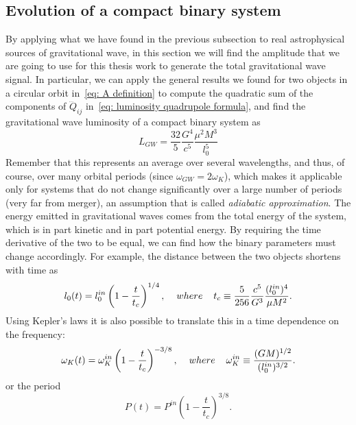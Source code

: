 \subsection{Evolution of a compact binary system}
By applying what we have found in the previous subsection to real astrophysical sources of gravitational wave, in this section we will find the amplitude that we are going to use for this thesis work to generate the total gravitational wave signal.
In particular, we can apply the general results we found for two objects in a circular orbit in~\eqref{eq: A definition} to compute the quadratic sum of the components of $\dddot{Q}_{ij}$ in~\eqref{eq: luminosity quadrupole formula}, and find the gravitational wave luminosity of a compact binary system as
\[
    L_{GW}=\frac{32}{5}\frac{G^4}{c^5}\frac{\mu^2 M^3}{l_0^5}
\]
Remember that this represents an average over several wavelengths, and thus, of course, over many orbital periods (since $\omega_{GW}=2\omega_K$), which makes it applicable only for systems that do not change significantly over a large number of periods (very far from merger), an assumption that is called \textit{adiabatic approximation}.
The energy emitted in gravitational waves comes from the total energy of the system, which is in part kinetic and in part potential energy. 
By requiring the time derivative of the two to be equal, we can find how the binary parameters must change accordingly. 
For example, the distance between the two objects shortens with time as
\begin{equation}
    l_0(t) = l_0^{in}\left(1-\frac{t}{t_c}\right)^{1/4},\hspace{4mm} where\hspace{4mm}    t_c\equiv \frac{5}{256}\frac{c^5}{G^3}\frac{(l_0^{in})^4}{\mu M^2}.
    \label{eq: l_0 time variation}
\end{equation}
Using Kepler's laws it is also possible to translate this in a time dependence on the frequency:
\begin{equation}
    \omega_K(t) = \omega_K^{in}\left(1-\frac{t}{t_c}\right)^{-3/8}, \hspace{4mm} where\hspace{4mm}\omega_K^{in} \equiv \frac{(GM)^{1/2}}{(l_0^{in})^{3/2}}.
    \label{eq: omega_K time variation}
\end{equation}
or the period
\begin{equation}
    P(t) = P^{in}\left(1-\frac{t}{t_c}\right)^{3/8}.
    \label{eq: P time variation}
\end{equation}

